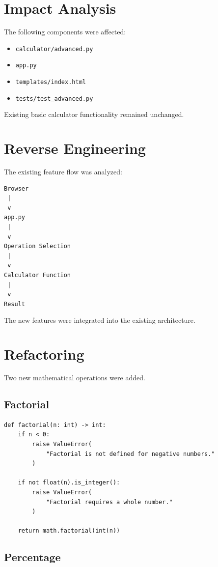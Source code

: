 \documentclass[12pt,a4paper,openany]{report}
\begin{document}
\section{Impact Analysis}

The following components were affected:

\begin{itemize}
    \item \texttt{calculator/advanced.py}
    \item \texttt{app.py}
    \item \texttt{templates/index.html}
    \item \texttt{tests/test\_advanced.py}
\end{itemize}

Existing basic calculator functionality remained unchanged.

\section{Reverse Engineering}

The existing feature flow was analyzed:

\begin{verbatim}
Browser
 |
 v
app.py
 |
 v
Operation Selection
 |
 v
Calculator Function
 |
 v
Result
\end{verbatim}

The new features were integrated into the existing architecture.

\section{Refactoring}

Two new mathematical operations were added.

\subsection{Factorial}

\begin{lstlisting}
def factorial(n: int) -> int:
    if n < 0:
        raise ValueError(
            "Factorial is not defined for negative numbers."
        )

    if not float(n).is_integer():
        raise ValueError(
            "Factorial requires a whole number."
        )

    return math.factorial(int(n))
\end{lstlisting}

\subsection{Percentage}
\end{document}
